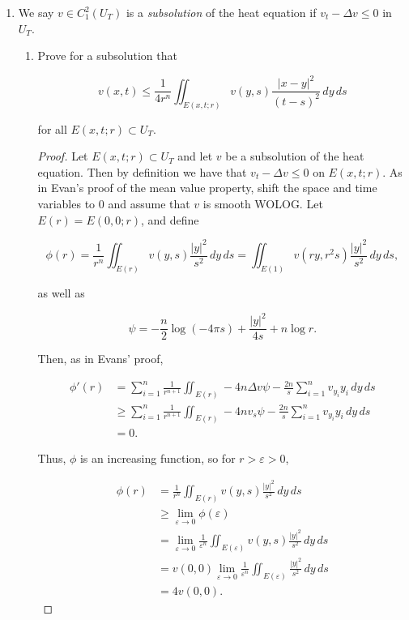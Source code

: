 \documentclass[11pt,oneside,english]{amsart}
\theoremstyle{definition}
\newcommand{\lom}[2]{\lim_{{#1}\rightarrow{#2}}}
\newcommand{\ve}{\varepsilon}
\begin{document}
\begin{enumerate}
\begin{proof}
Thus,

\begin{align*}
u(x,t)-v(x,t)-g(t)&=g(t)+\frac{x}{\sqrt{4\pi}}\int_0^t\frac{1}{(t-s)^{3/2}}e^{-\frac{x^2}{4(t-s)}}g(s)\,ds-g(t)\\[2mm]
&=\frac{x}{\sqrt{4\pi}}\int_0^t\frac{1}{(t-s)^{3/2}}e^{-\frac{x^2}{4(t-s)}}g(s)\,ds.
\end{align*}
\end{proof}


\item We say $v\in C^2_1(U_T)$ is a \textit{subsolution} of the heat equation if $v_t-\Delta v\leq 0$ in $U_T$.

\begin{enumerate}
\itemsep5mm

\item Prove for a subsolution that 

\[
v(x,t)\leq \frac{1}{4r^n}\iint_{E(x,t;r)} v(y,s)\frac{|x-y|^2}{(t-s)^2}\,dy\,ds
\]

for all $E(x,t;r)\subset U_T$.

\begin{proof}
Let $E(x,t;r)\subset U_T$ and let $v$ be a subsolution of the heat equation. Then by definition we have that $v_t-\Delta v\leq 0$ on $E(x,t;r)$. As in Evan's proof of the mean value property, shift the space and time variables to 0 and assume that $v$ is smooth WOLOG. Let $E(r)=E(0,0;r)$, and define

\[
\phi(r)=\frac{1}{r^n}\iint_{E(r)}v(y,s)\frac{|y|^2}{s^2}\,dy\,ds=\iint_{E(1)}v(ry,r^2s)\frac{|y|^2}{s^2}\,dy\,ds,
\]

as well as 

\[
\psi=-\frac{n}{2}\log(-4\pi s)+\frac{|y|^2}{4s}+n\log r.
\]



Then, as in Evans' proof,

\begin{align*}
\phi'(r)&= \sum_{i=1}^n \frac{1}{r^{n+1}}\iint_{E(r)}-4n\Delta v\psi-\frac{2n}{s}\sum_{i=1}^n v_{y_i}y_i\,dy\,ds\\[2mm]
&\geq \sum_{i=1}^n \frac{1}{r^{n+1}}\iint_{E(r)}-4n v_s\psi-\frac{2n}{s}\sum_{i=1}^n v_{y_i}y_i\,dy\,ds\\[2mm]
&=0.
\end{align*}

Thus, $\phi$ is an increasing function, so for $r>\ve>0$, 

\begin{align*}
\phi(r)&=\frac{1}{r^n}\iint_{E(r)}v(y,s)\frac{|y|^2}{s^2}\,dy\,ds\\[2mm]
&\geq\lom{\ve}{0}\phi(\ve)\\[2mm]
&=\lom{\ve}{0}\frac{1}{\ve^n}\iint_{E(\ve)}v(y,s)\frac{|y|^2}{s^2}\,dy\,ds\\[2mm]
&=v(0,0)\lom{\ve}{0}\frac{1}{\ve^n}\iint_{E(\ve)}\frac{|y|^2}{s^2}\,dy\,ds\\[2mm]
&=4v(0,0).
\end{align*}


\end{proof}
\end{enumerate}
\end{enumerate}
\end{document}
